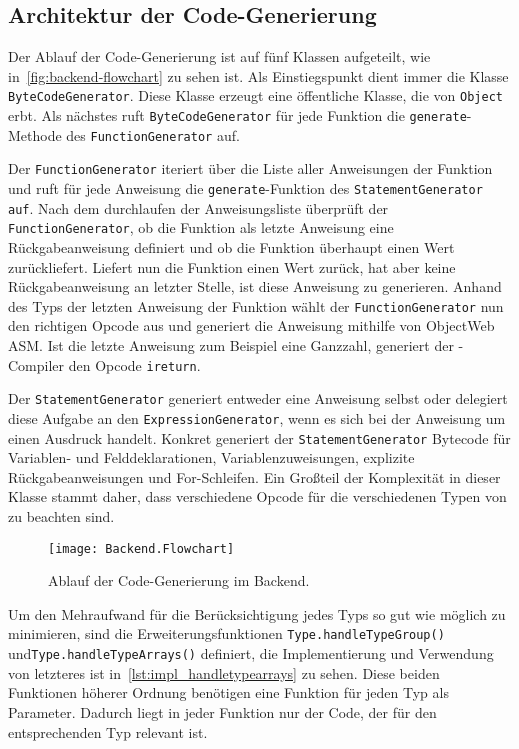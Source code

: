 \subsection{Architektur der Code-Generierung}

Der Ablauf der Code-Generierung ist auf fünf Klassen aufgeteilt, wie in~\autoref{fig:backend-flowchart} zu sehen ist. Als Einstiegspunkt dient immer die Klasse \texttt{ByteCodeGenerator}. Diese Klasse erzeugt eine öffentliche Klasse, die von \texttt{Object} erbt. Als nächstes ruft \texttt{ByteCodeGenerator} für jede Funktion die \texttt{generate}-Methode des \texttt{FunctionGenerator} auf.

Der \texttt{FunctionGenerator} iteriert über die Liste aller Anweisungen der Funktion und ruft für jede Anweisung die \texttt{generate}-Funktion des \texttt{StatementGenerator auf}. Nach dem durchlaufen der Anweisungsliste überprüft der \texttt{FunctionGenerator}, ob die Funktion als letzte Anweisung eine Rückgabeanweisung definiert und ob die Funktion überhaupt einen Wert zurückliefert. Liefert nun die Funktion einen Wert zurück, hat aber keine Rückgabeanweisung an letzter Stelle, ist diese Anweisung zu generieren. Anhand des Typs der letzten Anweisung der Funktion wählt der \texttt{FunctionGenerator} nun den richtigen Opcode aus und generiert die Anweisung mithilfe von ObjectWeb ASM. Ist die letzte Anweisung zum Beispiel eine Ganzzahl, generiert der \toya-Compiler den Opcode \texttt{ireturn}.

Der \texttt{StatementGenerator} generiert entweder eine Anweisung selbst oder delegiert diese Aufgabe an den \texttt{ExpressionGenerator}, wenn es sich bei der Anweisung um einen Ausdruck handelt. Konkret generiert der \texttt{StatementGenerator} Bytecode für Variablen- und Felddeklarationen, Variablenzuweisungen, explizite Rückgabeanweisungen und For-Schleifen. Ein Großteil der Komplexität in dieser Klasse stammt daher, dass verschiedene Opcode für die verschiedenen Typen von \toya zu beachten sind.

\begin{figure}[h]
    \caption{Ablauf der Code-Generierung im Backend.}
    \centering
    \texttt{[image: Backend.Flowchart]}
    \label{fig:backend-flowchart}
\end{figure}

Um den Mehraufwand für die Berücksichtigung jedes Typs so gut wie möglich zu minimieren, sind die Erweiterungsfunktionen \texttt{Type.handleTypeGroup()} und\break \texttt{Type.handleTypeArrays()} definiert, die Implementierung und Verwendung von letzteres ist in~\autoref{lst:impl_handletypearrays} zu sehen. Diese beiden Funktionen höherer Ordnung benötigen eine Funktion für jeden Typ als Parameter. Dadurch liegt in jeder Funktion nur der Code, der für den entsprechenden Typ relevant ist.

